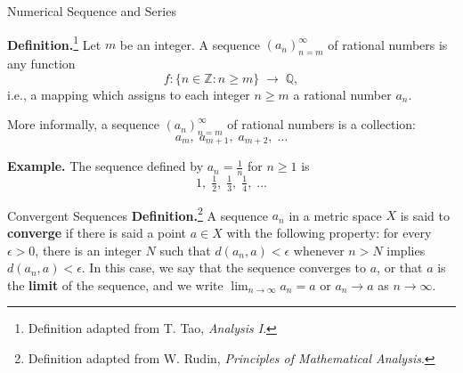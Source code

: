 \documentclass{beamer}
\begin{document}
\begin{frame}{Numerical Sequence and Series}

\textbf{Definition.}\footnote{Definition adapted from T. Tao, \emph{Analysis I}.} Let $m$ be an integer.  
A sequence $(a_n)_{n=m}^{\infty}$ of rational numbers is any function
\[
f: \{ n \in \mathbb{Z} : n \geq m \} \;\to\; \mathbb{Q},
\]
i.e., a mapping which assigns to each integer $n \geq m$ a rational number $a_n$.

\medskip
More informally, a sequence $(a_n)_{n=m}^{\infty}$ of rational numbers is a collection:
\[
a_m, \; a_{m+1}, \; a_{m+2}, \; \dots
\]

\bigskip
\textbf{Example.}  
The sequence defined by $a_n = \tfrac{1}{n}$ for $n \geq 1$ is
\[
1, \; \tfrac{1}{2}, \; \tfrac{1}{3}, \; \tfrac{1}{4}, \; \dots
\]

    
\end{frame}

\begin{frame}{Convergent Sequences}
\textbf{Definition.}\footnote{Definition adapted from W. Rudin, \emph{Principles of Mathematical Analysis}.}
A sequence ${a_n}$ in a metric space $X$ is said to \textbf{converge} if there is said a point $a \in X$ with the following property: for every $\epsilon > 0$, there is an integer $N$ such that $d(a_n, a) < \epsilon$ whenever $n > N$ implies $d(a_n,a)< \epsilon$.  In this case, we say that the sequence converges to $a$, or that $a$ is the \textbf{limit} of the sequence, and we write $\lim_{n \to \infty} a_n = a$ or $a_n \to a$ as $n \to \infty$.
\end{frame}
\end{document}
